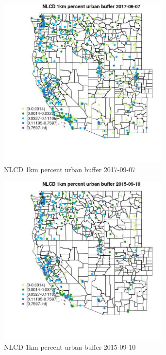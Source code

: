 \begin{figure} 
\centering  
\includegraphics[width=0.77\textwidth]{Code_Outputs/Report_ML_input_PM25_Step4_part_e_de_duplicated_aves_compiled_2019-05-20wNAs_MapObsNLCD_1km_percent_urban_buffer2017-09-07.jpg} 
\caption{\label{fig:Report_ML_input_PM25_Step4_part_e_de_duplicated_aves_compiled_2019-05-20wNAsMapObsNLCD_1km_percent_urban_buffer2017-09-07}NLCD 1km percent urban buffer 2017-09-07} 
\end{figure} 
 

\begin{figure} 
\centering  
\includegraphics[width=0.77\textwidth]{Code_Outputs/Report_ML_input_PM25_Step4_part_e_de_duplicated_aves_compiled_2019-05-20wNAs_MapObsNLCD_1km_percent_urban_buffer2015-09-10.jpg} 
\caption{\label{fig:Report_ML_input_PM25_Step4_part_e_de_duplicated_aves_compiled_2019-05-20wNAsMapObsNLCD_1km_percent_urban_buffer2015-09-10}NLCD 1km percent urban buffer 2015-09-10} 
\end{figure} 
 

